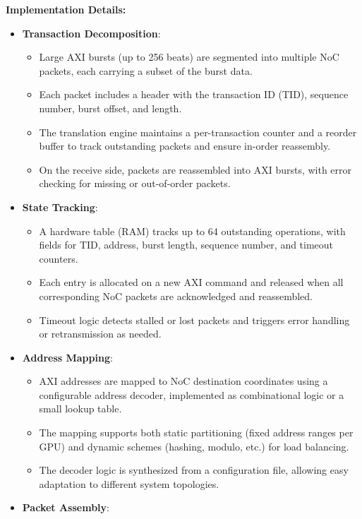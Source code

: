 \documentclass[11pt,a4paper]{article}
\begin{document}
\textbf{Implementation Details:}
\begin{itemize}
    \item \textbf{Transaction Decomposition}:
    \begin{itemize}
        \item Large AXI bursts (up to 256 beats) are segmented into multiple NoC packets, each carrying a subset of the burst data.
        \item Each packet includes a header with the transaction ID (TID), sequence number, burst offset, and length.
        \item The translation engine maintains a per-transaction counter and a reorder buffer to track outstanding packets and ensure in-order reassembly.
        \item On the receive side, packets are reassembled into AXI bursts, with error checking for missing or out-of-order packets.
    \end{itemize}
    \item \textbf{State Tracking}:
    \begin{itemize}
        \item A hardware table (RAM) tracks up to 64 outstanding operations, with fields for TID, address, burst length, sequence number, and timeout counters.
        \item Each entry is allocated on a new AXI command and released when all corresponding NoC packets are acknowledged and reassembled.
        \item Timeout logic detects stalled or lost packets and triggers error handling or retransmission as needed.
    \end{itemize}
    \item \textbf{Address Mapping}:
    \begin{itemize}
        \item AXI addresses are mapped to NoC destination coordinates using a configurable address decoder, implemented as combinational logic or a small lookup table.
        \item The mapping supports both static partitioning (fixed address ranges per GPU) and dynamic schemes (hashing, modulo, etc.) for load balancing.
        \item The decoder logic is synthesized from a configuration file, allowing easy adaptation to different system topologies.
    \end{itemize}
    \item \textbf{Packet Assembly}:
    \begin{itemize}

\end{itemize}
\end{itemize}
\end{document}
